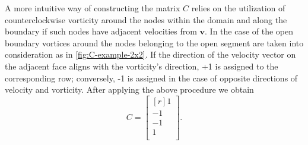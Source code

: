 \documentclass{article}
\begin{document}

A more intuitive way of constructing the matrix $C$ relies on the utilization of counterclockwise vorticity around the nodes within the domain and along the boundary if such nodes have adjacent velocities from $\boldsymbol{v}$. In the case of the open boundary vortices around the nodes belonging to the open segment are taken into consideration as in \cref{fig:C-example-2x2}. If the direction of the velocity vector on the adjacent face aligns with the vorticity's direction, +1 is assigned to the corresponding row; conversely, -1 is assigned in the case of opposite directions of velocity and vorticity. After applying the above procedure we obtain
\begin{equation*}
  C = 
  \begin{bmatrix*}[r]
  1		\\
  -1	\\
  -1	\\
  1		\\
\end{bmatrix*}.
\end{equation*}
\end{document}
